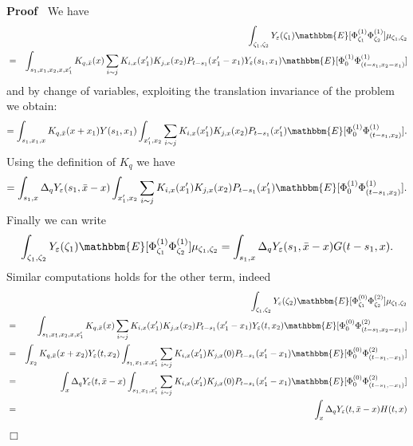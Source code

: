 \documentclass[a4paper,11pt]{article}
\newenvironment{proof}{\noindent\textbf{Proof\ }}{\hspace*{\fill}$\Box$\medskip}
\begin{document}
\begin{proof}
  We have
  \begin{eqnarray*}
    &  & \int_{\zeta_1, \zeta_2} Y_{\varepsilon} (\zeta_1) \mathbbm{E}
    [\Phi^{(1)}_{\zeta_1} \Phi^{(1)}_{\zeta_2}] \mu_{\zeta_1, \zeta_2}\\
    & = & \int_{s_1, x_1, x_2, x, x_1'} K_{q, \bar{x}} (x) \sum_{i \sim j}
    K_{i, x} (x_1') K_{j, x} (x_2) P_{t - s_1} (x_1' - x_1) Y_{\varepsilon}
    (s_1, x_1) \mathbbm{E} [\Phi^{(1)}_0 \Phi^{(1)}_{(t - s_1, x_2 - x_1)}]
  \end{eqnarray*}
  and by change of variables, exploiting the translation invariance of the
  problem we obtain:
  \[ = \int_{s_1, x_1, x} K_{q, \bar{x}} (x + x_1) Y (s_1, x_1) \int_{x_1',
     x_2}  \sum_{i \sim j} K_{i, x} (x_1') K_{j, x} (x_2) P_{t - s_1} (x_1')
     \mathbbm{E} [\Phi^{(1)}_0 \Phi^{(1)}_{(t - s_1, x_2)}] . \]
  Using the definition of $K_q$ we have
  \[ = \int_{s_1, x} \Delta_q Y_{\varepsilon} (s_1, \bar{x} - x) \int_{x_1',
     x_2}  \sum_{i \sim j} K_{i, x} (x_1') K_{j, x} (x_2) P_{t - s_1} (x_1')
     \mathbbm{E} [\Phi^{(1)}_0 \Phi^{(1)}_{(t - s_1, x_2)}] . \]
  Finally we can write
  \[ \int_{\zeta_1, \zeta_2} Y_{\varepsilon} (\zeta_1) \mathbbm{E}
     [\Phi^{(1)}_{\zeta_1} \Phi^{(1)}_{\zeta_2}] \mu_{\zeta_1, \zeta_2} =
     \int_{s_1, x} \Delta_q Y_{\varepsilon} (s_1, \bar{x} - x) G (t - s_1, x)
     . \]
  Similar computations holds for the other term, indeed
  \begin{eqnarray*}
    &  & \int_{\zeta_1, \zeta_2} Y_{\varepsilon} (\zeta_2) \mathbbm{E}
    [\Phi^{(0)}_{\zeta_1} \Phi^{(2)}_{\zeta_2}] \mu_{\zeta_1, \zeta_2}\\
    & = & \int_{s_1, x_1, x_2, x, x_1'} K_{q, \bar{x}} (x) \sum_{i \sim j}
    K_{i, x} (x_1') K_{j, x} (x_2) P_{t - s_1} (x_1' - x_1) Y_{\varepsilon}
    (t, x_2) \mathbbm{E} [\Phi^{(0)}_0 \Phi^{(2)}_{(t - s_1, x_2 - x_1)}]\\
    & = & \int_{x_2} K_{q, \bar{x}} (x + x_2) Y_{\varepsilon} (t, x_2)
    \int_{s_{1,} x_1, x, x_1'}  \sum_{i \sim j} K_{i, x} (x_1') K_{j, x} (0)
    P_{t - s_1} (x_1' - x_1) \mathbbm{E} [\Phi^{(0)}_0 \Phi^{(2)}_{(t - s_1, -
    x_1)}]\\
    & = & \int_x \Delta_q Y_{\varepsilon} (t, \bar{x} - x) \int_{s_{1,} x_1,
    x_1'}  \sum_{i \sim j} K_{i, x} (x_1') K_{j, x} (0) P_{t - s_1} (x_1' -
    x_1) \mathbbm{E} [\Phi^{(0)}_0 \Phi^{(2)}_{(t - s_1, - x_1)}]\\
    & = & \int_x \Delta_q Y_{\varepsilon} (t, \bar{x} - x) H (t, x)
  \end{eqnarray*}
\end{proof}
\end{document}
